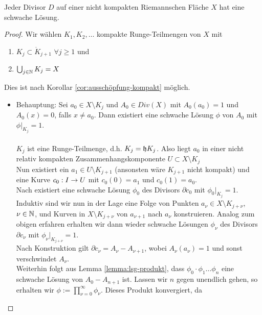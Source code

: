 \begin{lemma}
  \label{lemma:schwache-Lösung-Divisor}
  Jeder Divisor $D$ auf einer nicht kompakten Riemannschen Fläche $X$ hat eine
  schwache Lösung.
\end{lemma}

\begin{proof}
  Wir wählen $K_1, K_2, \dots$ kompakte Runge-Teilmengen von $X$ mit
  \begin{enumerate}
  \item $K_j \subset \mathring{K}_{j+1}$ $\forall j \geq 1$ und
  \item $\bigcup_{j \in \mathbb{N}} K_j = X$
  \end{enumerate}
  Dies ist nach Korollar \ref{cor:ausschöpfung-kompakt} möglich.
  \begin{itemize}
  \item Behauptung: Sei $a_0 \in X \setminus K_j$ und $A_0 \in Div(X)$
    mit $A_0(a_0) = 1$ und $A_0(x) = 0$, falls $x \neq a_0$. Dann
    existiert eine schwache Lösung $\phi$ von $A_0$ mit $\phi |_{K_j}
    = 1$. \\
    \\
    $K_j$ ist eine Runge-Teilmenge, d.h. $K_j = \mathfrak{h}{K_j}$. Also
    liegt $a_0$ in einer nicht relativ kompakten
    Zusammenhangskomponente $U \subset X \setminus K_j$ \\
    Nun existiert ein $a_1 \in U \setminus K_{j+1}$ (ansonsten wäre
    $K_{j+1}$ nicht kompakt) und eine Kurve $c_0: I \rightarrow U$ mit
    $c_0(0)=a_1$ und $c_0(1) = a_0$. \\
    Nach \cite[Lemma 20.5]{For} existiert eine schwache Lösung $\phi_0$ des Divisors
    $\partial c_0$ mit $\phi_0|_{K_j} = 1$. \\
    Induktiv sind wir nun in der Lage eine Folge von Punkten $a_\nu \in
    X \setminus K_{j+ \nu}$, $\nu \in \mathbb{N}$, und Kurven in $X \setminus
    K_{j+\nu}$ von $a_{\nu+1}$ nach $a_\nu$ konstruieren. Analog zum
    obigen erfahren erhalten wir dann wieder schwache Lösungen
    $\phi_\nu$ des Divisors $\partial c_\nu$ mit $\phi_\nu |_{K_{j+\nu}}
    = 1$. \\
    Nach Konstruktion gilt $\partial c_\nu = A_\nu - A_{\nu+1}$, wobei
    $A_\nu(a_\nu) = 1$ und sonst verschwindet $A_\nu$. \\
    Weiterhin folgt aus Lemma \ref{lemma:lsg-produkt}, dass $\phi_0 \cdot \phi_1 \dots \phi_n$ eine
    schwache Lösung von $A_0 - A_{n+1}$ ist.
    Lassen wir $n$ gegen unendlich gehen, so erhalten wir $\phi :=
    \prod_{\nu = 0}^\infty \phi_\nu$. Dieses Produkt konvergiert, da

\end{itemize}
\end{proof}
